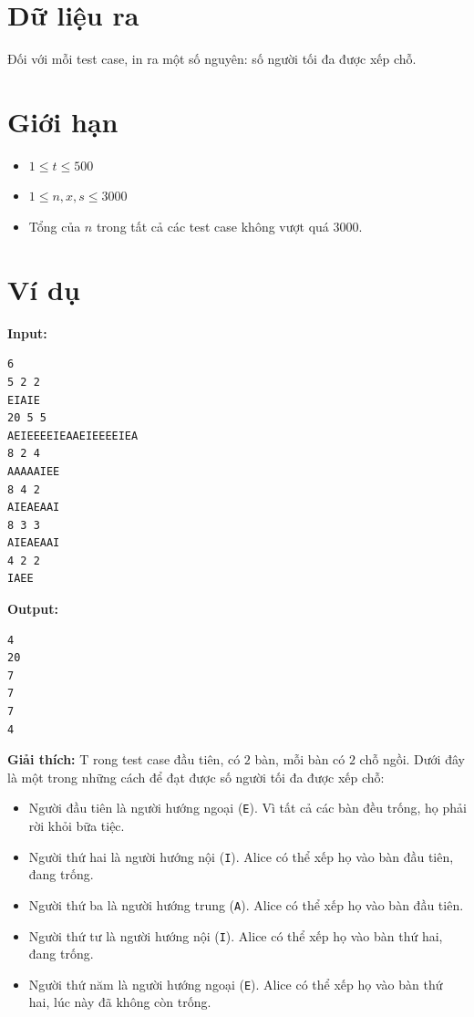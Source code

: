 \documentclass[11pt]{article}
\newcommand{\explanation}[1]{
    \vspace{0.5cm}
    \noindent \textbf{Giải thích:} #1
}
\begin{document}
\section*{Dữ liệu ra}
\begin{outputbox}
Đối với mỗi test case, in ra một số nguyên: số người tối đa được xếp chỗ.
\end{outputbox}

\section*{Giới hạn}
\begin{constraintbox}
\begin{itemize}
    \item $1 \le t \le 500$
    \item $1 \le n, x, s \le 3000$
    \item Tổng của $n$ trong tất cả các test case không vượt quá $3000$.
\end{itemize}
\end{constraintbox}

\section*{Ví dụ}
\textbf{Input:}
\begin{lstlisting}
6
5 2 2
EIAIE
20 5 5
AEIEEEEIEAAEIEEEEIEA
8 2 4
AAAAAIEE
8 4 2
AIEAEAAI
8 3 3
AIEAEAAI
4 2 2
IAEE
\end{lstlisting}

\textbf{Output:}
\begin{lstlisting}
4
20
7
7
7
4
\end{lstlisting}

\explanation
Trong test case đầu tiên, có $2$ bàn, mỗi bàn có $2$ chỗ ngồi. Dưới đây là một trong những cách để đạt được số người tối đa được xếp chỗ:

\begin{itemize}
    \item Người đầu tiên là người hướng ngoại (\texttt{E}). Vì tất cả các bàn đều trống, họ phải rời khỏi bữa tiệc.
    \item Người thứ hai là người hướng nội (\texttt{I}). Alice có thể xếp họ vào bàn đầu tiên, đang trống.
    \item Người thứ ba là người hướng trung (\texttt{A}). Alice có thể xếp họ vào bàn đầu tiên.
    \item Người thứ tư là người hướng nội (\texttt{I}). Alice có thể xếp họ vào bàn thứ hai, đang trống.
    \item Người thứ năm là người hướng ngoại (\texttt{E}). Alice có thể xếp họ vào bàn thứ hai, lúc này đã không còn trống.
\end{itemize}
\end{document}
